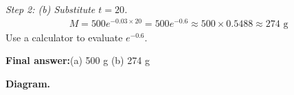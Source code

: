 \documentclass[11pt]{article}
\begin{document}
\textit{Step 2: (b) Substitute \( t = 20 \).}
\[\begin{gathered}
M = 500e^{-0.03 \times 20} = 500e^{-0.6} \approx 500 \times 0.5488 \approx 274 \text{ g}
\end{gathered}\]
Use a calculator to evaluate \( e^{-0.6} \).

\begin{answerbox}
\textbf{Final answer:}\quad (a) 500 g \quad  (b) 274 g
\end{answerbox}
\textbf{Diagram.}

\begin{center}
\end{center}
\end{document}

